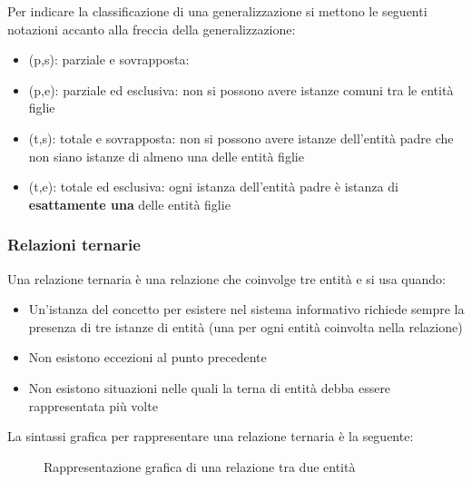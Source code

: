 \documentclass[a4paper]{article}
\begin{document}
\vspace{1em}
\noindent
Per indicare la classificazione di una generalizzazione si mettono le seguenti
notazioni accanto alla freccia della generalizzazione:
\begin{itemize}
  \item (p,s): parziale e sovrapposta: 
  \item (p,e): parziale ed esclusiva: non si possono avere istanze comuni tra le entità figlie
  \item (t,s): totale e sovrapposta: non si possono avere istanze dell'entità padre
    che non siano istanze di almeno una delle entità figlie
  \item (t,e): totale ed esclusiva: ogni istanza dell'entità padre è istanza
    di \textbf{esattamente una} delle entità figlie
\end{itemize}

\subsubsection{Relazioni ternarie}
Una relazione ternaria è una relazione che coinvolge tre entità e si usa quando:
\begin{itemize}
  \item Un'istanza del concetto per esistere nel sistema informativo richiede sempre
    la presenza di tre istanze di entità (una per ogni entità coinvolta nella relazione)

  \item Non esistono eccezioni al punto precedente
  \item Non esistono situazioni nelle quali la terna di entità debba essere rappresentata
    più volte
\end{itemize}
La sintassi grafica per rappresentare una relazione ternaria è la seguente:

\begin{figure}[H]
  \centering
  \caption{Rappresentazione grafica di una relazione tra due entità}
\end{figure}
\end{document}
